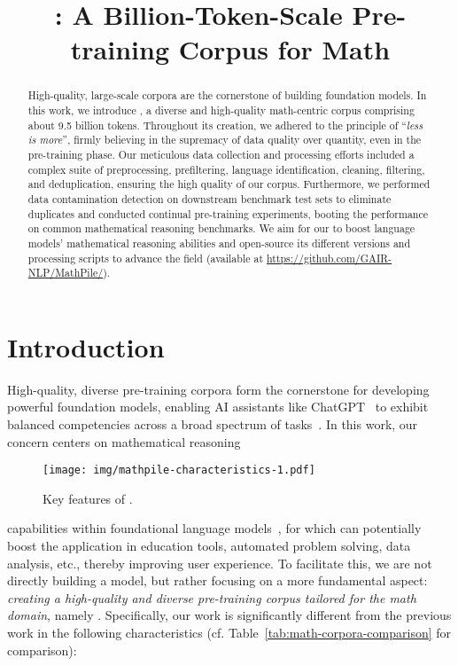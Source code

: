\title{\mathpile: A Billion-Token-Scale Pre-training Corpus for Math}



\doparttoc
\faketableofcontents

\maketitle

\begin{abstract}

High-quality, large-scale corpora are the cornerstone of building foundation models. In this work, we introduce \mathpile, a diverse and high-quality math-centric corpus comprising about 9.5 billion tokens. Throughout its creation, we adhered to the principle of ``\emph{less is more}'', firmly believing in the supremacy of data quality over quantity, even in the pre-training phase. Our meticulous data collection and processing efforts included a complex suite of preprocessing, prefiltering, language identification, cleaning, filtering, and deduplication, ensuring the high quality of our corpus. Furthermore, we performed data contamination detection on downstream benchmark test sets to eliminate duplicates and conducted continual pre-training experiments, booting the performance on common mathematical reasoning benchmarks. We aim for our \mathpile to boost language models' mathematical reasoning abilities and open-source its different versions and processing scripts to advance the field (available at \url{https://github.com/GAIR-NLP/MathPile/}).

\end{abstract}

\section{Introduction}

High-quality, diverse pre-training corpora form the cornerstone for developing powerful foundation models, enabling AI assistants like ChatGPT~\citep{openai-chatgpt} to exhibit balanced competencies across a broad spectrum of tasks~\citep{DBLP:journals/corr/abs-2303-12712-sparks-agi}. In this work, our concern centers on mathematical reasoning \begin{wrapfigure}{r}{5.7cm}
\centering 
\texttt{[image: img/mathpile-characteristics-1.pdf]} 
\caption{Key features of \mathpile.} 
\label{fig:math-pile-characteristics}
\end{wrapfigure}capabilities within foundational language models~, for which can potentially boost the application in education tools, automated problem solving, data analysis, etc., thereby improving user experience. To facilitate this, we are not directly building a model, but rather focusing on a more fundamental aspect: \emph{creating a high-quality and diverse pre-training corpus tailored for the math domain}, namely \mathpile. Specifically, our work is significantly different from the previous work in the following characteristics (cf. Table~\ref{tab:math-corpora-comparison} for comparison):

